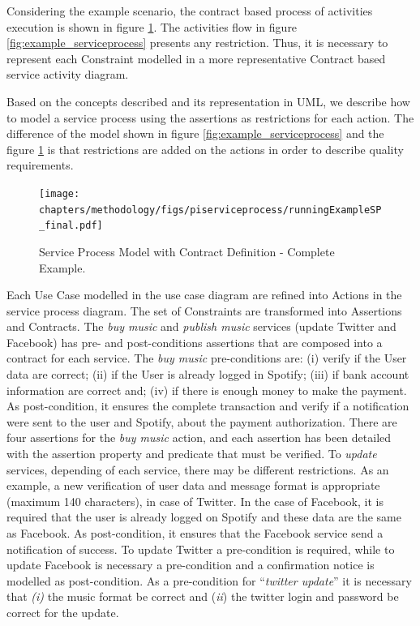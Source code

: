 Considering the example scenario, the contract based process of activities
execution is shown in figure \ref{fig:serviceprocessContract}.
The activities flow in figure \ref{fig:example_serviceprocess} presents any restriction. Thus, it is necessary
to represent each {\sc Constraint} modelled in a more representative {\sc
Contract} based service activity diagram.

Based on the concepts described and its representation in UML, we describe how
to model a service process using the assertions as restrictions for each action.
The difference of the model shown in figure \ref{fig:example_serviceprocess}
and the figure \ref{fig:serviceprocessContract} is that restrictions are added
on the actions in order to describe quality requirements.


\begin{figure}[ht!]
\centering
\texttt{[image: chapters/methodology/figs/piserviceprocess/runningExampleSP\_final.pdf]}
\caption{Service Process Model with Contract Definition - Complete Example.}
\label{fig:serviceprocessContract}
\end{figure}




Each {\sc Use Case} modelled in the use case diagram are refined into {\sc
Actions} in the service process diagram. The set of {\sc Constraints} are
transformed into {\sc Assertions} and {\sc Contracts}. The \textit{buy music}
and \textit{publish music} services (update Twitter and Facebook) has pre- and
post-conditions assertions that are composed into a contract for each service. 
 The  \textit{buy music} pre-conditions are: (i) verify if the User
data are correct; (ii) if the User is already logged in Spotify; (iii) if bank
account information are correct and; (iv) if there is enough money to make the
payment. As post-condition, it ensures the complete transaction and verify if a
notification were sent to the user and Spotify, about the payment authorization.
There are four assertions for the \textit{buy music} action, and each assertion
has been detailed with the assertion property and predicate that must be verified. 
To \textit{update} services, depending of each service, there may be different
restrictions. As an example, a new verification of user data and message format
is appropriate (maximum 140 characters), in case of Twitter. In the case of Facebook, it is required that
the user is already logged on Spotify and these data are the same as
Facebook. As post-condition, it ensures that the Facebook service send a
notification of success. To update Twitter a
pre-condition is required, while to update Facebook is necessary
a pre-condition and a confirmation notice is modelled as post-condition. As a
pre-condition for ``\textit{twitter update}'' it is necessary that \textit{(i)}
the music format be correct and (\textit{ii})  the twitter login and password be
correct for the update.


